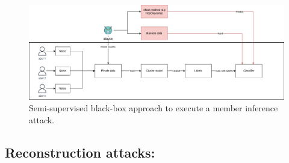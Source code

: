 \begin{figure}[h]
  \label{figure:MIA-semi-supervised}
  \includegraphics[width=1\textwidth]{TheorethicalFramework/Differential privacy/master-thesis-MIA.png}
  \caption{Semi-supervised black-box approach to execute a member inference attack.}
\end{figure}

\subsection{Reconstruction attacks:}

